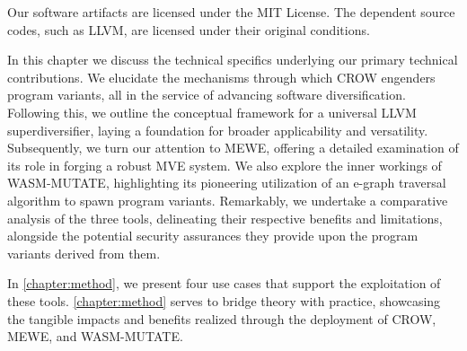 Our software artifacts are licensed under the MIT License. The dependent source codes, such as LLVM, are licensed under their original conditions.


In this chapter we discuss the technical specifics underlying our primary technical contributions.
We elucidate the mechanisms through which CROW engenders program variants, all in the service of advancing software diversification. 
Following this, we outline the conceptual framework for a universal LLVM superdiversifier, laying a foundation for broader applicability and versatility.
Subsequently, we turn our attention to MEWE, offering a detailed examination of its role in forging a robust MVE system. 
We also explore the inner workings of WASM-MUTATE, highlighting its pioneering utilization of an e-graph traversal algorithm to spawn \wasm program variants. 
Remarkably, we undertake a comparative analysis of the three tools, delineating their respective benefits and limitations, alongside the potential security assurances they provide upon the program variants derived from them. 

In \autoref{chapter:method}, we present four use cases that support the exploitation of these tools.
\autoref{chapter:method} serves to bridge theory with practice, showcasing the tangible impacts and benefits realized through the deployment of CROW, MEWE, and WASM-MUTATE.
